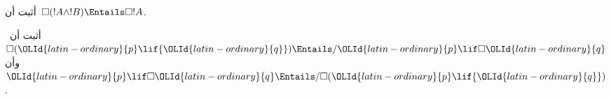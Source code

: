 \documentclass[../../../include/open-logic-section]{subfiles}
\begin{document}
\begin{prob}
  أثبت أن~$\Box (!A \land !B) \Entails \Box !A$.
\end{prob}

\begin{prob}
  أثبت أن~$\Box ({\OLId{latin-ordinary}{p}} \lif {\OLId{latin-ordinary}{q}}) \Entails/ {\OLId{latin-ordinary}{p}} \lif \Box {\OLId{latin-ordinary}{q}}$ وأن
  ${\OLId{latin-ordinary}{p}} \lif \Box {\OLId{latin-ordinary}{q}} \Entails/\Box ({\OLId{latin-ordinary}{p}} \lif {\OLId{latin-ordinary}{q}})$.
\end{prob}
\end{document}
